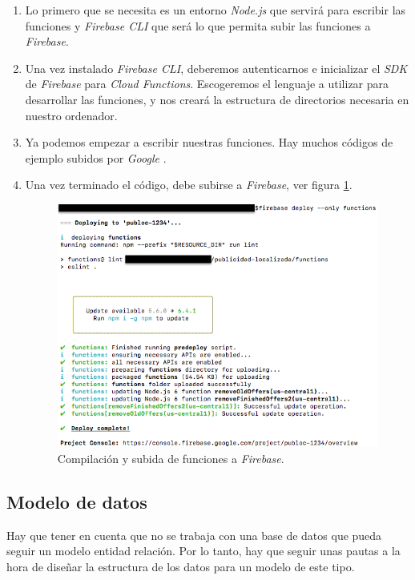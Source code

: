 \begin{enumerate}
\item Lo primero que se necesita es un entorno \textit{Node.js} que servirá para escribir las funciones y \textit{Firebase CLI} que será lo que permita subir las funciones a \textit{Firebase}.

\item Una vez instalado \textit{Firebase CLI}, deberemos autenticarnos e inicializar el \textit{SDK} de \textit{Firebase} para \textit{Cloud Functions}. Escogeremos el lenguaje a utilizar para desarrollar las funciones, y nos creará la estructura de directorios necesaria en nuestro ordenador.

\item Ya podemos empezar a escribir nuestras funciones. Hay muchos códigos de ejemplo subidos por \textit{Google} \cite{noauthor_cloud_nodate-1}.

\item Una vez terminado el código, debe subirse a \textit{Firebase}, ver figura \ref{fig:cloud-deploy}.

\begin{figure}[tb]
\centering
\includegraphics[scale=0.6]{figures/cloud-deploy.png}
\caption{Compilación y subida de funciones a \textit{Firebase}.\label{fig:cloud-deploy}}
\end{figure}
\end{enumerate}

\subsection{Modelo de datos}
Hay que tener en cuenta que no se trabaja con una base de datos que pueda seguir un modelo entidad relación. Por lo tanto, hay que seguir unas pautas a la hora de diseñar la estructura de los datos para un modelo de este tipo.

